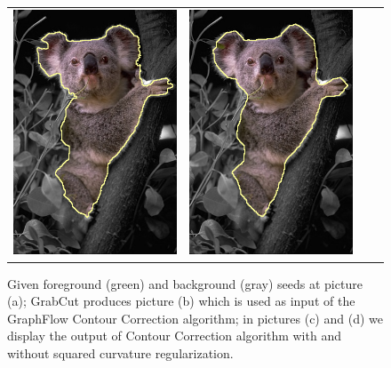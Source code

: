 \begin{figure}[]
\begin{tabular}{cccc}
 	\includegraphics[scale=0.25]{figures/chapter8/segmentation/coala/k-0.0/corrected-seg.png} &  	
 	\includegraphics[scale=0.25]{figures/chapter8/segmentation/coala/k-1.0/corrected-seg.png}
\end{tabular}	
\caption{Given foreground (green) and background (gray) seeds at picture (a); GrabCut produces picture (b) which is used as input of the GraphFlow Contour Correction algorithm; in pictures (c) and (d) we display the output of Contour Correction algorithm with and without squared curvature regularization. }
\label{fig:ch8-segmentation}
\end{figure}
